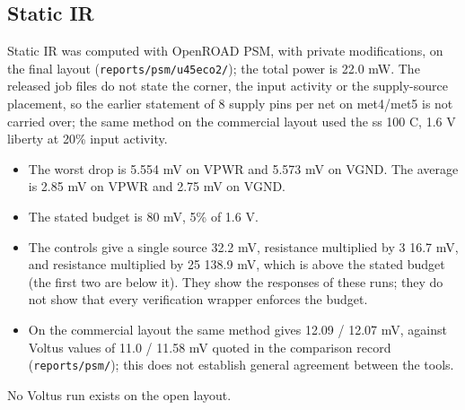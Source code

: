 \documentclass[11pt,letterpaper]{article}
\newcommand{\sk}[1]{\texttt{#1}}
\renewcommand{\_}{\textunderscore\penalty0\hskip0pt\relax}
\begin{document}
\subsection*{Static IR}
Static IR was computed with OpenROAD PSM, with private modifications, on the final layout (\sk{reports/psm/u45eco2/}); the total power is 22.0 mW. The released job files do not state the corner, the input activity or the supply-source placement, so the earlier statement of 8 supply pins per net on met4/met5 is not carried over; the same method on the commercial layout used the ss 100 \textdegree C, 1.6 V liberty at 20\% input activity.
\begin{itemize}
\item The worst drop is 5.554 mV on VPWR and 5.573 mV on VGND. The average is 2.85 mV on VPWR and 2.75 mV on VGND.
\item The stated budget is 80 mV, 5\% of 1.6 V.
\item The controls give a single source 32.2 mV, resistance multiplied by 3 16.7 mV, and resistance multiplied by 25 138.9 mV, which is above the stated budget (the first two are below it). They show the responses of these runs; they do not show that every verification wrapper enforces the budget.
\item On the commercial layout the same method gives 12.09 / 12.07 mV, against Voltus values of 11.0 / 11.58 mV quoted in the comparison record (\sk{reports/psm/}); this does not establish general agreement between the tools.
\end{itemize}
No Voltus run exists on the open layout.
\end{document}
